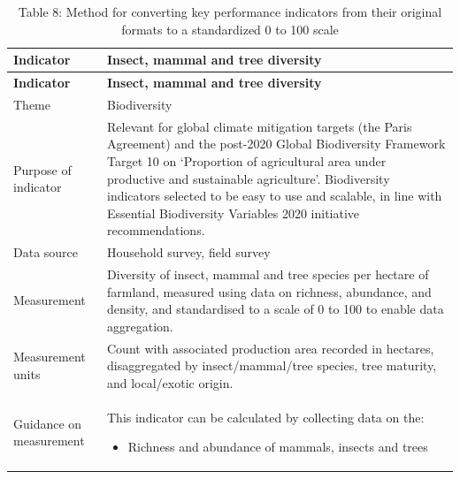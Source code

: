 \documentclass[
  letterpaper,
  DIV=11,
  numbers=noendperiod]{scrreprt}
\providecommand{\tightlist}{%
  \setlength{\itemsep}{0pt}\setlength{\parskip}{0pt}}
\begin{document}
\begin{longtable}[]{@{}
  >{\raggedright\arraybackslash}p{}
  >{\raggedright\arraybackslash}p{}@{}}
\caption{Table 8: Method for converting key performance indicators from
their original formats to a standardized 0 to 100 scale}\tabularnewline
\toprule\noalign{}
\begin{minipage}[b]{\linewidth}\raggedright
\textbf{Indicator}
\end{minipage} & \begin{minipage}[b]{\linewidth}\raggedright
\textbf{Insect, mammal and tree diversity}
\end{minipage} \\
\midrule\noalign{}
\endfirsthead
\toprule\noalign{}
\begin{minipage}[b]{\linewidth}\raggedright
\textbf{Indicator}
\end{minipage} & \begin{minipage}[b]{\linewidth}\raggedright
\textbf{Insect, mammal and tree diversity}
\end{minipage} \\
\midrule\noalign{}
\endhead
\bottomrule\noalign{}
\endlastfoot
Theme & Biodiversity \\
Purpose of indicator & Relevant for global climate mitigation targets
(the Paris Agreement) and the post-2020 Global Biodiversity Framework
Target 10 on `Proportion of agricultural area under productive and
sustainable agriculture'. Biodiversity indicators selected to be easy to
use and scalable, in line with Essential Biodiversity Variables 2020
initiative recommendations. \\
Data source & Household survey, field survey \\
Measurement & Diversity of insect, mammal and tree species per hectare
of farmland, measured using data on richness, abundance, and density,
and standardised to a scale of 0 to 100 to enable data aggregation. \\
Measurement units & Count with associated production area recorded in
hectares, disaggregated by insect/mammal/tree species, tree maturity,
and local/exotic origin. \\
Guidance on measurement & \begin{minipage}[t]{\linewidth}\raggedright
This indicator can be calculated by collecting data on the:

\begin{itemize}
\tightlist
\item
  Richness and abundance of mammals, insects and trees
\end{itemize}


\end{minipage}
\end{longtable}
\end{document}
